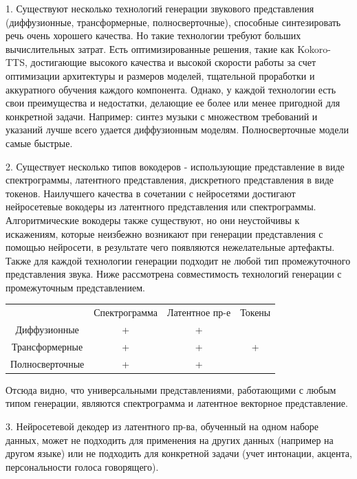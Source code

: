 1. Существуют несколько технологий генерации звукового представления (диффузионные, трансформерные, полносверточные), способные синтезировать речь очень хорошего качества. Но такие технологии требуют больших вычислительных затрат. 
Есть оптимизированные решения, такие как Kokoro-TTS, достигающие высокого качества и высокой скорости работы за счет оптимизации архитектуры и размеров моделей, тщательной проработки и аккуратного обучения каждого компонента. 
Однако, у каждой технологии есть свои преимущества и недостатки, делающие ее более или менее пригодной для конкретной задачи.
Например: синтез музыки с множеством требований и указаний лучше всего удается диффузионным моделям. Полносверточные модели самые быстрые. 

2. Существует несколько типов вокодеров - использующие представление в виде спектрограммы, латентного представления, дискретного представления в виде токенов. Наилучшего качества в сочетании с нейросетями достигают нейросетевые вокодеры из латентного представления или спектрограммы. 
Алгоритмические вокодеры также существуют, но они неустойчивы к искажениям, которые неизбежно возникают при генерации представления с помощью нейросети, в результате чего появляются нежелательные артефакты.
Также для каждой технологии генерации подходит не любой тип промежуточного представления звука. Ниже рассмотрена совместимость технологий генерации с промежуточным представлением.

\begin{center}
\begin{tabular}{ c c c c }
                 & Спектрограмма & Латентное пр-е & Токены \\
    Диффузионные & +             & +              &        \\ 
  Трансформерные & +             & +              & +      \\  
 Полносверточные & +             & +              &     
\end{tabular}
\end{center}

Отсюда видно, что универсальными представлениями, работающими с любым типом генерации, являются спектрограмма и латентное векторное представление. 

3. Нейросетевой декодер из латентного пр-ва, обученный на одном наборе данных, 
может не подходить для применения на других данных (например на другом языке) или 
не подходить для конкретной задачи (учет интонации, акцента, персональности голоса говорящего).

